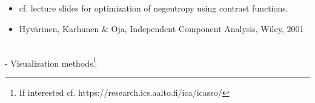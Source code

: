 \begin{frame}
\begin{itemize}
\item[] cf. lecture slides for optimization of negentropy using contrast functions.
\item[] Hyv\"arinen, Karhunen \& Oja, Independent Component Analysis, Wiley, 2001
\end{itemize}
\end{frame}

\begin{frame}
\\

- Visualization methods\footnote{If interested cf. https://research.ics.aalto.fi/ica/icasso/}
\end{frame}

